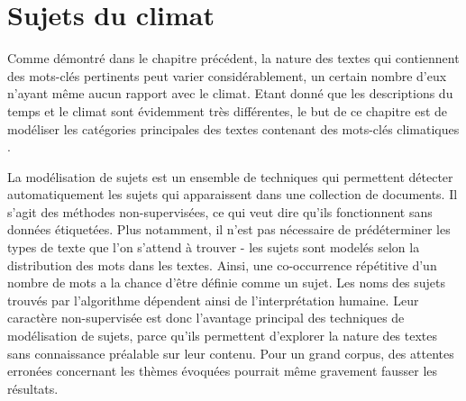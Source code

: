 \documentclass[a4paper,twoside,12pt]{article}
\begin{document}
\section{Sujets du climat} \label{topic_modeling}

Comme démontré dans le chapitre précédent, la nature des textes qui contiennent des mots-clés pertinents peut varier considérablement, un certain nombre d'eux n'ayant même aucun rapport avec le climat. Etant donné que les descriptions du temps et le climat sont évidemment très différentes, le but de ce chapitre est de modéliser les catégories principales des textes contenant des mots-clés \og climatiques \fg{}.

La modélisation de sujets est un ensemble de techniques qui permettent détecter automatiquement les \og sujets \fg{} qui apparaissent dans une collection de documents. Il s'agit des méthodes non-supervisées, ce qui veut dire qu'ils fonctionnent sans données étiquetées. Plus notamment, il n'est pas nécessaire de prédéterminer les types de texte que l'on s'attend à trouver - les sujets sont modelés selon la distribution des mots dans les textes. Ainsi, une co-occurrence répétitive d'un nombre de mots a la chance d'être définie comme un sujet. Les noms des sujets trouvés par l'algorithme dépendent ainsi de l'interprétation humaine. Leur caractère non-supervisée est donc l'avantage principal des techniques de modélisation de sujets, parce qu'ils permettent d'explorer la nature des textes sans connaissance préalable sur leur contenu. Pour un grand corpus, des attentes erronées concernant les thèmes évoquées pourrait même gravement fausser les résultats.
\end{document}
